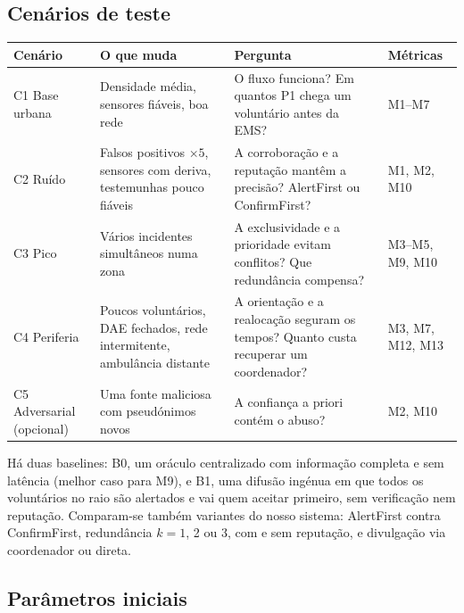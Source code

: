 \documentclass[10pt,a4paper]{article}
\begin{document}
\subsection{Cenários de teste}\label{sec:cenarios}

{\small
\noindent\begin{tabularx}{\linewidth}{@{}P{2.4cm}LLl@{}}
\toprule
Cenário & O que muda & Pergunta & Métricas \\
\midrule
C1 Base urbana & Densidade média, sensores fiáveis, boa rede & O fluxo funciona? Em quantos P1 chega um voluntário antes da EMS? & M1--M7 \\
C2 Ruído & Falsos positivos $\times 5$, sensores com deriva, testemunhas pouco fiáveis & A corroboração e a reputação mantêm a precisão? AlertFirst ou ConfirmFirst? & M1, M2, M10 \\
C3 Pico & Vários incidentes simultâneos numa zona & A exclusividade e a prioridade evitam conflitos? Que redundância compensa? & M3--M5, M9, M10 \\
C4 Periferia & Poucos voluntários, DAE fechados, rede intermitente, ambulância distante & A orientação e a realocação seguram os tempos? Quanto custa recuperar um coordenador? & M3, M7, M12, M13 \\
C5 Adversarial (opcional) & Uma fonte maliciosa com pseudónimos novos & A confiança a priori contém o abuso? & M2, M10 \\
\bottomrule
\end{tabularx}
}

Há duas baselines: B0, um oráculo centralizado com informação completa e sem latência (melhor caso para M9), e B1, uma difusão ingénua em que todos os voluntários no raio são alertados e vai quem aceitar primeiro, sem verificação nem reputação. Comparam-se também variantes do nosso sistema: AlertFirst contra ConfirmFirst, redundância $k = 1$, 2 ou 3, com e sem reputação, e divulgação via coordenador ou direta.

\subsection{Parâmetros iniciais}\label{sec:parametros}
\end{document}
